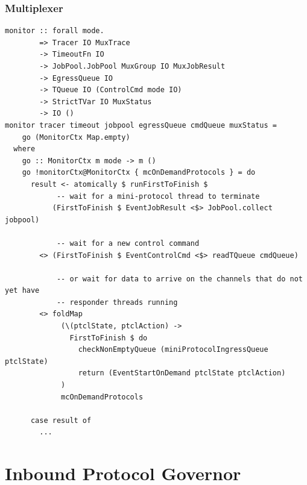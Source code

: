 \documentclass[t,dvipsnames,hyperref={colorlinks,citecolor=NavyBlue,linkcolor=NavyBlue,anchorcolor=NavyBlue,urlcolor=NavyBlue}]{beamer}
\begin{document}
\begin{frame}[fragile]
  \frametitle{Multiplexer}
  \begin{verbatim}
monitor :: forall mode.
        => Tracer IO MuxTrace
        -> TimeoutFn IO
        -> JobPool.JobPool MuxGroup IO MuxJobResult
        -> EgressQueue IO
        -> TQueue IO (ControlCmd mode IO)
        -> StrictTVar IO MuxStatus
        -> IO ()
monitor tracer timeout jobpool egressQueue cmdQueue muxStatus =
    go (MonitorCtx Map.empty)
  where
    go :: MonitorCtx m mode -> m ()
    go !monitorCtx@MonitorCtx { mcOnDemandProtocols } = do
      result <- atomically $ runFirstToFinish $
            -- wait for a mini-protocol thread to terminate
           (FirstToFinish $ EventJobResult <$> JobPool.collect jobpool)

            -- wait for a new control command
        <> (FirstToFinish $ EventControlCmd <$> readTQueue cmdQueue)

            -- or wait for data to arrive on the channels that do not yet have
            -- responder threads running
        <> foldMap
             (\(ptclState, ptclAction) ->
               FirstToFinish $ do
                 checkNonEmptyQueue (miniProtocolIngressQueue ptclState)
                 return (EventStartOnDemand ptclState ptclAction)
             )
             mcOnDemandProtocols

      case result of
        ...
  \end{verbatim}
\end{frame}

\section{Inbound Protocol Governor}
\end{document}
